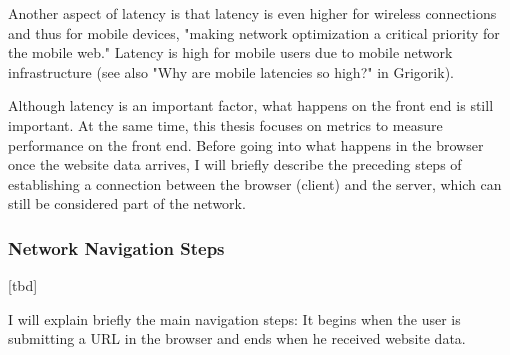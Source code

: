
Another aspect of latency is that latency is even higher for wireless connections and thus for mobile devices, "making network optimization a critical priority for the mobile web." %
Latency is high for mobile users due to mobile network infrastructure (see also "Why are mobile latencies so high?" in Grigorik). %



Although latency is an important factor, what happens on the front end is still important.
At the same time, this thesis focuses on metrics to measure performance on the front end.
Before going into what happens in the browser once the website data arrives, I will briefly describe the preceding steps of establishing a connection between the browser (client) and the server, which can still be considered part of the network.








\subsubsection{Network Navigation Steps}
\label{subsubsection:network_navigation_steps}


[tbd]

I will explain briefly the main navigation steps: It begins when the user is submitting a URL in the browser and ends when he received website data.



